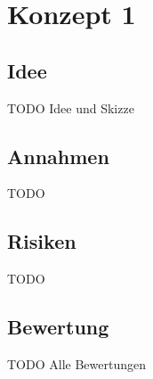 \section{Konzept 1}

\subsection{Idee}
TODO Idee und Skizze

\subsection{Annahmen}
TODO

\subsection{Risiken}
TODO

\subsection{Bewertung}
TODO Alle Bewertungen